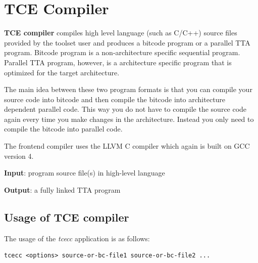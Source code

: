 \documentclass[twoside]{tceusermanual}
\begin{document}
\section{TCE Compiler}
\label{sec:frontend}

\textbf{TCE compiler} compiles high level language (such as 
C/C++) source files provided by the toolset user and produces a bitcode
program or a parallel TTA program. Bitcode program is a non-architecture
specific sequential program. Parallel TTA program, however, is 
a architecture specific program that is optimized for the target architecture.

The main idea between these two program formats is that you can compile your
source code into bitcode and then compile the bitcode into architecture
dependent parallel code. This way you do not have to compile the source code
again every time you make changes in the architecture. Instead you only need
to compile the bitcode into parallel code.

The frontend compiler uses the LLVM C compiler which again is built on GCC
version 4.

\textbf{Input}: program source file(s) in high-level language

\textbf{Output}: a fully linked TTA program

\subsection{Usage of TCE compiler}

The usage of the \emph{tcecc} application is as follows:

\begin{verbatim}
tcecc <options> source-or-bc-file1 source-or-bc-file2 ...
\end{verbatim}
\end{document}
